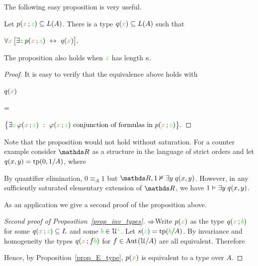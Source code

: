The following easy proposition is very useful.

\begin{proposition}\label{prop_E_type}
Let $p({\color{brown} x}\,;{\color{green} z})\subseteq L(A)$.
There is a type $q({\color{brown} x})\subseteq L(A)$ such that\smallskip

\hfil$\forall {\color{brown}x}\,\big[\exists {\color{green}z}\,p({\color{brown} x}\,;{\color{green} z})\ \leftrightarrow\ q({\color{brown} x})\big].$\smallskip

The proposition also holds when ${\color{green} z}$ has length $\kappa$.
\end{proposition}

\begin{proof}
  It is easy to verify that the equivalence above holds with
  \def\medrel#1{\parbox{6ex}{$\displaystyle\hfil #1$}}
  \def\ceq#1#2#3{\parbox[b]{10ex}{$\displaystyle #1$}\medrel{#2}$\displaystyle  #3$}

  \ceq{\hfill q({\mr x})}{=}{\big\{ \E {\gr z}\,\phi({\mr x}\,;{\gr z})\ :\ \phi({\mr x}\,;{\gr z}) \textrm{ conjunction of formulas in } p({\mr x}\,;{\gr z}) \big\}.}
\end{proof}

Note that the proposition would not hold without saturation.
For a counter example consider $\RR$ as a structure in the language of strict orders and let $q(x,y)={\rm tp}(0,1/A)$, where 


By quantifier elimination, $0\equiv_{A}1$ but $\RR,1\notmodels\E y\;q(x,y)$.
However, in any sufficiently saturated elementary extension of $\RR$, we have $1\vDash\exists y\;q(x,y)$.

As an application we give a second proof of the proposition above.

\begin{proof}[Second proof of Proposition~\ref{prop_inv_types}] $\Rightarrow$\quad  Write $p({\color{brown} x})$ as the type $q({\color{brown} x}\,;{\color{green} b})$ for some $q({\color{brown} x}\,;{\color{green} z})\subseteq L$ and some ${\color{green} b}\in\EuScript U^{\color{green} z}$.
Let $s({\color{green} z})={\rm tp}({\color{green} b}/A)$.
By invariance and homogeneity the types $q({\color{brown} x}\,;f{\color{green} b})$ for $f\in{\rm Aut\kern.15ex}(\EuScript U/A)$ are all equivalent.
Therefore

\smallskip

\smallskip

\smallskip

Hence, by Proposition~\ref{prop_E_type}, $p({\color{brown} x})$ is equivalent to a type over $A$.
\end{proof}

